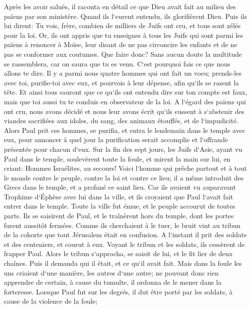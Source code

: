 \verse Après les avoir salués, il raconta en détail ce que Dieu avait fait au milieu des païens par son ministère. 
\verse Quand ils l`eurent entendu, ils glorifièrent Dieu. Puis ils lui dirent: Tu vois, frère, combien de milliers de Juifs ont cru, et tous sont zélés pour la loi. 
\verse Or, ils ont appris que tu enseignes à tous les Juifs qui sont parmi les païens à renoncer à Moïse, leur disant de ne pas circoncire les enfants et de ne pas se conformer aux coutumes. 
\verse Que faire donc? Sans aucun doute la multitude se rassemblera, car on saura que tu es venu. 
\verse C`est pourquoi fais ce que nous allons te dire. Il y a parmi nous quatre hommes qui ont fait un voeu; 
\verse prends-les avec toi, purifie-toi avec eux, et pourvois à leur dépense, afin qu`ils se rasent la tête. Et ainsi tous sauront que ce qu`ils ont entendu dire sur ton compte est faux, mais que toi aussi tu te conduis en observateur de la loi. 
\verse A l`égard des païens qui ont cru, nous avons décidé et nous leur avons écrit qu`ils eussent à s`abstenir des viandes sacrifiées aux idoles, du sang, des animaux étouffés, et de l`impudicité. 
\verse Alors Paul prit ces hommes, se purifia, et entra le lendemain dans le temple avec eux, pour annoncer à quel jour la purification serait accomplie et l`offrande présentée pour chacun d`eux. 
\verse Sur la fin des sept jours, les Juifs d`Asie, ayant vu Paul dans le temple, soulevèrent toute la foule, et mirent la main sur lui, 
\verse en criant: Hommes Israélites, au secours! Voici l`homme qui prêche partout et à tout le monde contre le peuple, contre la loi et contre ce lieu; il a même introduit des Grecs dans le temple, et a profané ce saint lieu. 
\verse Car ils avaient vu auparavant Trophime d`Éphèse avec lui dans la ville, et ils croyaient que Paul l`avait fait entrer dans le temple. 
\verse Toute la ville fut émue, et le peuple accourut de toutes parts. Ils se saisirent de Paul, et le traînèrent hors du temple, dont les portes furent aussitôt fermées. 
\verse Comme ils cherchaient à le tuer, le bruit vint au tribun de la cohorte que tout Jérusalem était en confusion. 
\verse A l`instant il prit des soldats et des centeniers, et courut à eux. Voyant le tribun et les soldats, ils cessèrent de frapper Paul. 
\verse Alors le tribun s`approcha, se saisit de lui, et le fit lier de deux chaînes. Puis il demanda qui il était, et ce qu`il avait fait. 
\verse Mais dans la foule les uns criaient d`une manière, les autres d`une autre; ne pouvant donc rien apprendre de certain, à cause du tumulte, il ordonna de le mener dans la forteresse. 
\verse Lorsque Paul fut sur les degrés, il dut être porté par les soldats, à cause de la violence de la foule; 
